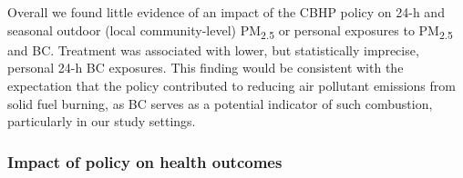 \documentclass[
  letterpaper,
  DIV=11,
  numbers=noendperiod]{scrartcl}
\begin{document}
Overall we found little evidence of an impact of the CBHP policy on 24-h
and seasonal outdoor (local community-level) PM\textsubscript{2.5} or
personal exposures to PM\textsubscript{2.5} and BC. Treatment was
associated with lower, but statistically imprecise, personal 24-h BC
exposures. This finding would be consistent with the expectation that
the policy contributed to reducing air pollutant emissions from solid
fuel burning, as BC serves as a potential indicator of such combustion,
particularly in our study settings.

\hypertarget{impact-of-policy-on-health-outcomes}{%
\subsubsection{Impact of policy on health
outcomes}\label{impact-of-policy-on-health-outcomes}}
\end{document}
